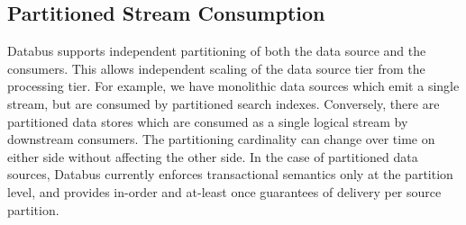 \subsection{Partitioned Stream Consumption}
Databus supports independent partitioning of both the data source and the consumers. This allows independent scaling of the data source tier from the processing tier. 
For example, we have monolithic data sources which emit a single stream, but are consumed by partitioned search indexes. Conversely, there are partitioned data stores which are consumed as a single logical stream by downstream consumers. The partitioning cardinality can change over time on either side without affecting the other side. 
In the case of partitioned data sources, Databus currently enforces transactional semantics only at the partition level, and provides in-order and at-least once guarantees of delivery per source partition. 



